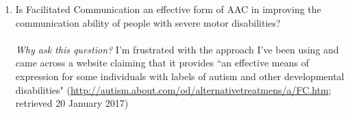 \documentclass[a4paper]{article}
\begin{document}
\begin{enumerate}
\item Is Facilitated Communication an effective form of AAC in improving the communication ability of people with severe motor disabilities? \\
\\
   \emph{Why ask this question?} I'm frustrated with the approach I've been using and came across a website claiming that it provides ``an effective means of expression for some individuals with labels of autism and other developmental disabilities" (\url{http://autism.about.com/od/alternativetreatmens/a/FC.htm}; retrieved 20 January 2017)

\end{enumerate}
\end{document}
